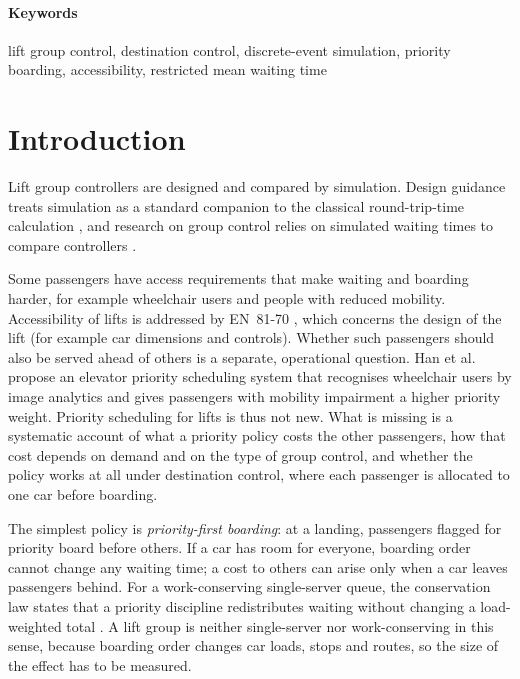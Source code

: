 \documentclass[12pt,a4paper]{article}
\begin{document}
\paragraph{Keywords} lift group control, destination control, discrete-event simulation, priority boarding, accessibility, restricted mean waiting time


\section{Introduction}\label{sec:intro}

Lift group controllers are designed and compared by simulation. Design guidance treats simulation as a standard companion to the classical round-trip-time calculation \cite{cibse2025,iso8100,barney2016}, and research on group control relies on simulated waiting times to compare controllers \cite{siikonen1993,crites1998,utgoff2012,wan2024}.

Some passengers have access requirements that make waiting and boarding harder, for example wheelchair users and people with reduced mobility. Accessibility of lifts is addressed by EN~81-70 \cite{en8170}, which concerns the design of the lift (for example car dimensions and controls). Whether such passengers should also be served ahead of others is a separate, operational question. Han et al.\ \cite{han2024} propose an elevator priority scheduling system that recognises wheelchair users by image analytics and gives passengers with mobility impairment a higher priority weight. Priority scheduling for lifts is thus not new. What is missing is a systematic account of what a priority policy costs the other passengers, how that cost depends on demand and on the type of group control, and whether the policy works at all under destination control, where each passenger is allocated to one car before boarding.

The simplest policy is \emph{priority-first boarding}: at a landing, passengers flagged for priority board before others. If a car has room for everyone, boarding order cannot change any waiting time; a cost to others can arise only when a car leaves passengers behind. For a work-conserving single-server queue, the conservation law states that a priority discipline redistributes waiting without changing a load-weighted total \cite{kleinrock1965,schrage1970}. A lift group is neither single-server nor work-conserving in this sense, because boarding order changes car loads, stops and routes, so the size of the effect has to be measured.
\end{document}
